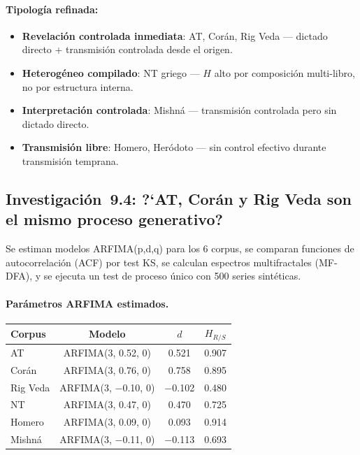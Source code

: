 \documentclass[12pt,a4paper]{article}
\begin{document}
\paragraph{Tipolog\'ia refinada:}
\begin{itemize}[leftmargin=2em]
\item \textbf{Revelaci\'on controlada inmediata}: AT, Cor\'an, Rig Veda ---
      dictado directo + transmisi\'on controlada desde el origen.
\item \textbf{Heterog\'eneo compilado}: NT griego --- $H$ alto por
      composici\'on multi-libro, no por estructura interna.
\item \textbf{Interpretaci\'on controlada}: Mishn\'a --- transmisi\'on
      controlada pero sin dictado directo.
\item \textbf{Transmisi\'on libre}: Homero, Her\'odoto --- sin control
      efectivo durante transmisi\'on temprana.
\end{itemize}


\subsection{Investigaci\'on~9.4: ?`AT, Cor\'an y Rig Veda son el mismo proceso generativo?}

Se estiman modelos ARFIMA(p,d,q) para los 6 corpus, se comparan funciones de
autocorrelaci\'on (ACF) por test KS, se calculan espectros multifractales
(MF-DFA), y se ejecuta un test de proceso \'unico con 500 series sint\'eticas.

\paragraph{Par\'ametros ARFIMA estimados.}
\begin{center}
\begin{tabular}{lccc}
\toprule
\textbf{Corpus} & \textbf{Modelo} & $d$ & $H_{R/S}$ \\
\midrule
AT         & ARFIMA(3, 0.52, 0) & 0.521 & 0.907 \\
Cor\'an    & ARFIMA(3, 0.76, 0) & 0.758 & 0.895 \\
Rig Veda   & ARFIMA(3, $-$0.10, 0) & $-$0.102 & 0.480 \\
NT         & ARFIMA(3, 0.47, 0) & 0.470 & 0.725 \\
Homero     & ARFIMA(3, 0.09, 0) & 0.093 & 0.914 \\
Mishn\'a   & ARFIMA(3, $-$0.11, 0) & $-$0.113 & 0.693 \\
\bottomrule
\end{tabular}
\end{center}
\end{document}
